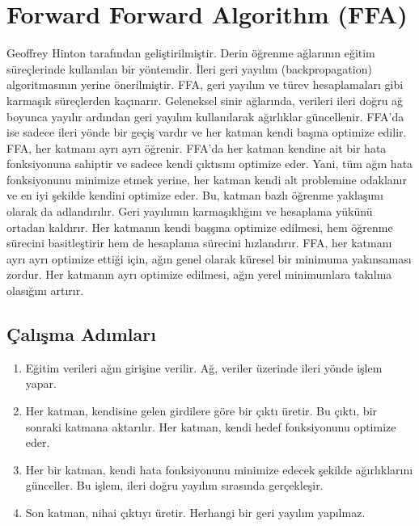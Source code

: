 \section{Forward Forward Algorithm (FFA)}

Geoffrey Hinton tarafından geliştirilmiştir. Derin öğrenme ağlarının eğitim süreçlerinde kullanılan bir yöntemdir. İleri geri yayılım (backpropagation) algoritmasının yerine önerilmiştir. FFA, geri yayılım ve türev hesaplamaları gibi karmaşık süreçlerden kaçınarır. Geleneksel sinir ağlarında, verileri ileri doğru ağ boyunca yayılır ardından geri yayılım kullanılarak ağırlıklar güncellenir. FFA'da ise sadece ileri yönde bir geçiş vardır ve her katman kendi başına optimize edilir. FFA, her katmanı ayrı ayrı öğrenir. FFA'da her katman kendine ait bir hata fonksiyonuna sahiptir ve sadece kendi çıktısını optimize eder. Yani, tüm ağın hata fonksiyonunu minimize etmek yerine, her katman kendi alt problemine odaklanır ve en iyi şekilde kendini optimize eder. Bu, katman bazlı öğrenme yaklaşımı olarak da adlandırılır. Geri yayılımın karmaşıklığını ve hesaplama yükünü ortadan kaldırır. Her katmanın kendi başşına optimize edilmesi, hem öğrenme sürecini basitleştirir hem de hesaplama sürecini hızlandırır. FFA, her katmanı ayrı ayrı optimize ettiği için, ağın genel olarak küresel bir minimuma yakınsaması zordur. Her katmanın ayrı optimize edilmesi, ağın yerel minimumlara takılma olasığını artırır.

\subsection{Çalışma Adımları}
\begin{enumerate}
    \item Eğitim verileri ağın girişine verilir. Ağ, veriler üzerinde ileri yönde işlem yapar.
    \item Her katman, kendisine gelen girdilere göre bir çıktı üretir. Bu çıktı, bir sonraki katmana aktarılır. Her katman, kendi hedef fonksiyonunu optimize eder.
    \item Her bir katman, kendi hata fonksiyonunu minimize edecek şekilde ağırlıklarını günceller. Bu işlem, ileri doğru yayılım sırasında gerçekleşir.
    \item Son katman, nihai çıktıyı üretir. Herhangi bir geri yayılım yapılmaz.
\end{enumerate}



\newpage